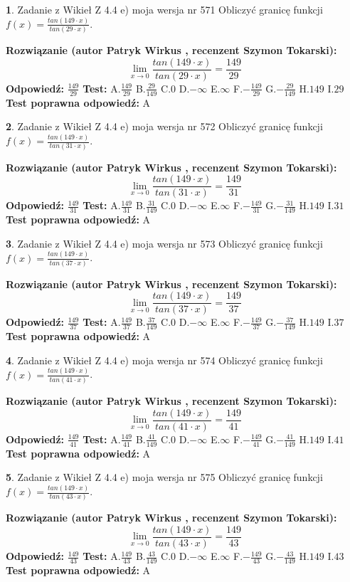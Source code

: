 \documentclass[12pt, a4paper]{article}
\theoremstyle{definition} %
\newtheorem{zad}{}
\newcommand{\zadStart}[1]{\begin{zad}#1\newline}
\newcommand{\zadStop}{\end{zad}}
\newcommand{\rozwStart}[2]{\noindent \textbf{Rozwiązanie (autor #1 , recenzent #2): }\newline}
\newcommand{\rozwStop}{\newline}
\newcommand{\odpStart}{\noindent \textbf{Odpowiedź:}\newline}
\newcommand{\odpStop}{\newline}
\newcommand{\testStart}{\noindent \textbf{Test:}\newline}
\newcommand{\testStop}{\newline}
\newcommand{\kluczStart}{\noindent \textbf{Test poprawna odpowiedź:}\newline}
\newcommand{\kluczStop}{\newline}
\begin{document}
\zadStart{Zadanie z Wikieł Z 4.4 e) moja wersja nr 571}
Obliczyć granicę funkcji $f(x)=\frac{tan(149\cdot x)}{tan(29\cdot x)}$.
\zadStop
\rozwStart{Patryk Wirkus}{Szymon Tokarski}
$$\lim\limits_{x\to 0}\frac{tan(149\cdot x)}{tan(29\cdot x)}=
\frac{149}{29}$$
\rozwStop
\odpStart
$\frac{149}{29}$
\odpStop
\testStart
A.$\frac{149}{29}$
B.$\frac{29}{149}$
C.$0$
D.$-\infty$
E.$\infty$
F.$-\frac{149}{29}$
G.$-\frac{29}{149}$
H.$149$
I.$29$
\testStop
\kluczStart
A
\kluczStop



\zadStart{Zadanie z Wikieł Z 4.4 e) moja wersja nr 572}
Obliczyć granicę funkcji $f(x)=\frac{tan(149\cdot x)}{tan(31\cdot x)}$.
\zadStop
\rozwStart{Patryk Wirkus}{Szymon Tokarski}
$$\lim\limits_{x\to 0}\frac{tan(149\cdot x)}{tan(31\cdot x)}=
\frac{149}{31}$$
\rozwStop
\odpStart
$\frac{149}{31}$
\odpStop
\testStart
A.$\frac{149}{31}$
B.$\frac{31}{149}$
C.$0$
D.$-\infty$
E.$\infty$
F.$-\frac{149}{31}$
G.$-\frac{31}{149}$
H.$149$
I.$31$
\testStop
\kluczStart
A
\kluczStop



\zadStart{Zadanie z Wikieł Z 4.4 e) moja wersja nr 573}
Obliczyć granicę funkcji $f(x)=\frac{tan(149\cdot x)}{tan(37\cdot x)}$.
\zadStop
\rozwStart{Patryk Wirkus}{Szymon Tokarski}
$$\lim\limits_{x\to 0}\frac{tan(149\cdot x)}{tan(37\cdot x)}=
\frac{149}{37}$$
\rozwStop
\odpStart
$\frac{149}{37}$
\odpStop
\testStart
A.$\frac{149}{37}$
B.$\frac{37}{149}$
C.$0$
D.$-\infty$
E.$\infty$
F.$-\frac{149}{37}$
G.$-\frac{37}{149}$
H.$149$
I.$37$
\testStop
\kluczStart
A
\kluczStop



\zadStart{Zadanie z Wikieł Z 4.4 e) moja wersja nr 574}
Obliczyć granicę funkcji $f(x)=\frac{tan(149\cdot x)}{tan(41\cdot x)}$.
\zadStop
\rozwStart{Patryk Wirkus}{Szymon Tokarski}
$$\lim\limits_{x\to 0}\frac{tan(149\cdot x)}{tan(41\cdot x)}=
\frac{149}{41}$$
\rozwStop
\odpStart
$\frac{149}{41}$
\odpStop
\testStart
A.$\frac{149}{41}$
B.$\frac{41}{149}$
C.$0$
D.$-\infty$
E.$\infty$
F.$-\frac{149}{41}$
G.$-\frac{41}{149}$
H.$149$
I.$41$
\testStop
\kluczStart
A
\kluczStop



\zadStart{Zadanie z Wikieł Z 4.4 e) moja wersja nr 575}
Obliczyć granicę funkcji $f(x)=\frac{tan(149\cdot x)}{tan(43\cdot x)}$.
\zadStop
\rozwStart{Patryk Wirkus}{Szymon Tokarski}
$$\lim\limits_{x\to 0}\frac{tan(149\cdot x)}{tan(43\cdot x)}=
\frac{149}{43}$$
\rozwStop
\odpStart
$\frac{149}{43}$
\odpStop
\testStart
A.$\frac{149}{43}$
B.$\frac{43}{149}$
C.$0$
D.$-\infty$
E.$\infty$
F.$-\frac{149}{43}$
G.$-\frac{43}{149}$
H.$149$
I.$43$
\testStop
\kluczStart
A
\kluczStop
\end{document}
